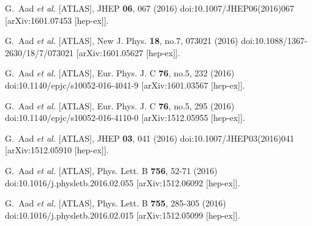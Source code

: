 \begin{thebibliography}{9}
G.~Aad \textit{et al.} [ATLAS],
JHEP \textbf{06}, 067 (2016)
doi:10.1007/JHEP06(2016)067
[arXiv:1601.07453 [hep-ex]].

G.~Aad \textit{et al.} [ATLAS],
New J. Phys. \textbf{18}, no.7, 073021 (2016)
doi:10.1088/1367-2630/18/7/073021
[arXiv:1601.05627 [hep-ex]].

G.~Aad \textit{et al.} [ATLAS],
Eur. Phys. J. C \textbf{76}, no.5, 232 (2016)
doi:10.1140/epjc/s10052-016-4041-9
[arXiv:1601.03567 [hep-ex]].

G.~Aad \textit{et al.} [ATLAS],
Eur. Phys. J. C \textbf{76}, no.5, 295 (2016)
doi:10.1140/epjc/s10052-016-4110-0
[arXiv:1512.05955 [hep-ex]].

G.~Aad \textit{et al.} [ATLAS],
JHEP \textbf{03}, 041 (2016)
doi:10.1007/JHEP03(2016)041
[arXiv:1512.05910 [hep-ex]].

G.~Aad \textit{et al.} [ATLAS],
Phys. Lett. B \textbf{756}, 52-71 (2016)
doi:10.1016/j.physletb.2016.02.055
[arXiv:1512.06092 [hep-ex]].

G.~Aad \textit{et al.} [ATLAS],
Phys. Lett. B \textbf{755}, 285-305 (2016)
doi:10.1016/j.physletb.2016.02.015
[arXiv:1512.05099 [hep-ex]].


\end{thebibliography}
